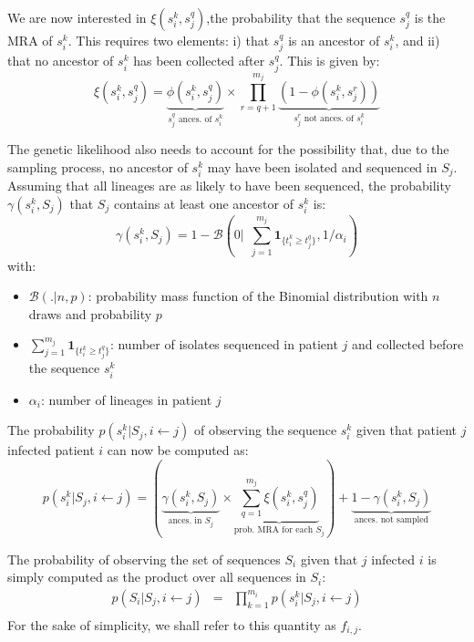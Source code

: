 \documentclass[10pt]{article}
\begin{document}
We are now interested in $\xi(s_i^k, s_j^q)$,the probability that the sequence $s_j^q$ is the MRA of $s_i^k$.
This requires two elements: i) that $s_j^q$ is an ancestor of $s_i^k$, and ii) that no ancestor of $s_i^k$ has been collected after $s_j^q$.
This is given by:
$$
\xi(s_i^k, s_j^q) = \underbrace{\phi(s_i^k, s_j^q)}_{s_j^q \mbox{ ances. of } s_i^k} \times 
\prod_{r=q+1}^{m_j} \underbrace{(1 - \phi(s_i^k, s_j^r))}_{s_j^r \mbox{ not ances. of } s_i^k}
$$


The genetic likelihood also needs to account for the possibility that, due to the sampling process, no ancestor of $s_i^k$ may have been isolated and sequenced in $S_j$.
Assuming that all lineages are as likely to have been sequenced, the probability $\gamma(s_i^k, S_j)$ that $S_j$ contains at least one ancestor of $s_i^k$ is:
$$
\gamma(s_i^k, S_j) = 1 - \mathcal{B}\left(0 \lvert \:\: \sum_{j=1}^{m_j}\mathbf{1}_{\{t_i^k \geq t_j^q\}}, 1/\alpha_i \right)
$$
with:
\begin{itemize}
\item $\mathcal{B}(.\lvert n,p)$: probability mass function of the Binomial distribution with $n$ draws and probability $p$
\item $\sum_{j=1}^{m_j}\mathbf{1}_{\{t_i^k \geq t_j^q\}}$: number of isolates sequenced in patient $j$ and collected before the sequence $s_i^k$
\item $\alpha_i$: number of lineages in patient $j$
\end{itemize}


The probability $p(s_i^k | S_j, i \leftarrow j)$ of observing the sequence $s_i^k$ given that patient $j$ infected patient $i$ can now be computed as:
$$
p(s_i^k | S_j, i \leftarrow j) = 
(\underbrace{\gamma(s_i^k, S_j)}_{\mbox{ances. in }S_j} \times 
\underbrace{\sum_{q=1}^{m_j}\xi(s_i^k, s_j^q)}_{\mbox{prob. MRA for each }S_j} ) + 
\underbrace{1 - \gamma(s_i^k, S_j)}_{\mbox{ances. not sampled}}
$$


The probability of observing the set of sequences $S_i$ given that $j$ infected $i$ is simply computed as the product over all sequences in $S_i$:
\begin{eqnarray*}
p(S_i | S_j, i \leftarrow j) & = & \prod_{k=1}^{m_i} p(s_i^k | S_j, i \leftarrow j) \\
\end{eqnarray*}
For the sake of simplicity, we shall refer to this quantity as $f_{i,j}$.
\\
\end{document}
